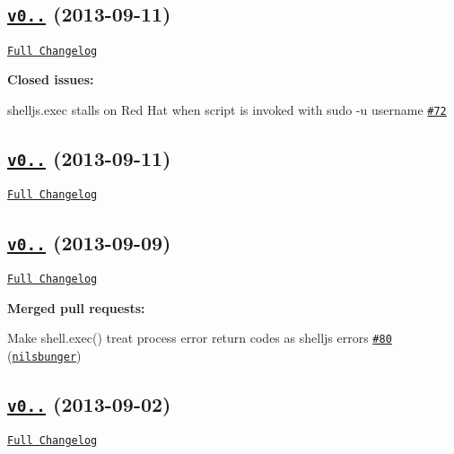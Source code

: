 \subsection*{\href{https://github.com/shelljs/shelljs/tree/v0.2.5}{\tt v0..} (2013-\/09-\/11)}

\href{https://github.com/shelljs/shelljs/compare/v0.2.4...v0.2.5}{\tt Full Changelog}

{\bfseries Closed issues\+:}


\begin{DoxyItemize}
\item shelljs.\+exec stalls on Red Hat when script is invoked with \textquotesingle{}sudo -\/u username\textquotesingle{} \href{https://github.com/shelljs/shelljs/issues/72}{\tt \#72}
\end{DoxyItemize}

\subsection*{\href{https://github.com/shelljs/shelljs/tree/v0.2.4}{\tt v0..} (2013-\/09-\/11)}

\href{https://github.com/shelljs/shelljs/compare/v0.2.3...v0.2.4}{\tt Full Changelog}

\subsection*{\href{https://github.com/shelljs/shelljs/tree/v0.2.3}{\tt v0..} (2013-\/09-\/09)}

\href{https://github.com/shelljs/shelljs/compare/v0.2.2...v0.2.3}{\tt Full Changelog}

{\bfseries Merged pull requests\+:}


\begin{DoxyItemize}
\item Make shell.\+exec() treat process error return codes as shelljs errors \href{https://github.com/shelljs/shelljs/pull/80}{\tt \#80} (\href{https://github.com/nilsbunger}{\tt nilsbunger})
\end{DoxyItemize}

\subsection*{\href{https://github.com/shelljs/shelljs/tree/v0.2.2}{\tt v0..} (2013-\/09-\/02)}

\href{https://github.com/shelljs/shelljs/compare/v0.1.4...v0.2.2}{\tt Full Changelog}

